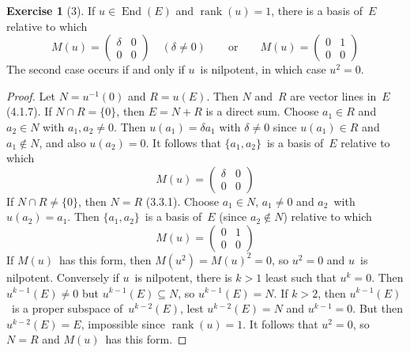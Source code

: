 \documentclass[letterpaper,12pt]{article}
\newcommand{\sect}{\cap}
\DeclareMathOperator{\End}{End}
\DeclareMathOperator{\rank}{rank}
\newcommand{\inv}[1]{#1^{-1}}
\newcommand{\kerz}[1]{\inv{#1}(0)}
\theoremstyle{definition}
\newtheorem*{exer}{Exercise}
\theoremstyle{remark}
\begin{document}
\begin{exer}[3]
If \(u\in\End(E)\) and \(\rank(u)=1\), there is a basis of~\(E\) relative to which
\[M(u)=\begin{pmatrix}
\delta&0\\
0&0
\end{pmatrix}
\quad(\delta\ne 0)
\qquad\text{or}\qquad
M(u)=\begin{pmatrix}
0&1\\
0&0
\end{pmatrix}\]
The second case occurs if and only if \(u\)~is nilpotent, in which case \(u^2=0\).
\end{exer}
\begin{proof}
Let \(N=\kerz{u}\) and \(R=u(E)\). Then \(N\) and~\(R\) are vector lines in~\(E\) (4.1.7). If \(N\sect R=\{0\}\), then \(E=N+R\) is a direct sum. Choose \(a_1\in R\) and \(a_2\in N\) with \(a_1,a_2\ne 0\). Then \(u(a_1)=\delta a_1\) with \(\delta\ne 0\) since \(u(a_1)\in R\) and \(a_1\not\in N\), and also \(u(a_2)=0\). It follows that \(\{a_1,a_2\}\)~is a basis of~\(E\) relative to which
\[M(u)=\begin{pmatrix}
\delta&0\\
0&0
\end{pmatrix}\]
If \(N\sect R\ne\{0\}\), then \(N=R\) (3.3.1). Choose \(a_1\in N\), \(a_1\ne 0\) and \(a_2\)~with \(u(a_2)=a_1\). Then \(\{a_1,a_2\}\)~is a basis of~\(E\) (since \(a_2\not\in N\)) relative to which
\[M(u)=\begin{pmatrix}
0&1\\
0&0
\end{pmatrix}\]
If \(M(u)\)~has this form, then \(M(u^2)=M(u)^2=0\), so \(u^2=0\) and \(u\)~is nilpotent. Conversely if \(u\)~is nilpotent, there is \(k>1\) least such that \(u^k=0\). Then \(u^{k-1}(E)\ne 0\) but \(u^{k-1}(E)\subseteq N\), so \(u^{k-1}(E)=N\). If \(k>2\), then \(u^{k-1}(E)\)~is a proper subspace of~\(u^{k-2}(E)\), lest \(u^{k-2}(E)=N\) and \(u^{k-1}=0\). But then \(u^{k-2}(E)=E\), impossible since \(\rank(u)=1\). It follows that \(u^2=0\), so \(N=R\) and \(M(u)\)~has this form.
\end{proof}
\end{document}
